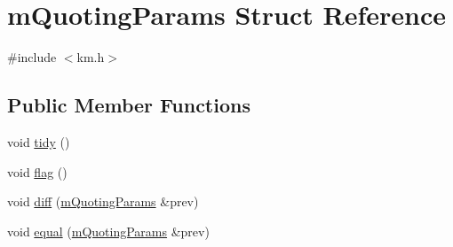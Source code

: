 \hypertarget{struct_k_1_1m_quoting_params}{}\section{m\+Quoting\+Params Struct Reference}
\label{struct_k_1_1m_quoting_params}


{\ttfamily \#include $<$km.\+h$>$}

\subsection*{Public Member Functions}
\begin{DoxyCompactItemize}
\item 
void \hyperlink{struct_k_1_1m_quoting_params_a5b3c419df4060973d19148fe5f75b275}{tidy} ()
\item 
void \hyperlink{struct_k_1_1m_quoting_params_a9897581e5bf85e3b75d7159f0621740f}{flag} ()
\item 
void \hyperlink{struct_k_1_1m_quoting_params_a342922b70b5ffb7b8b92b9b9ec1d9ee5}{diff} (\hyperlink{struct_k_1_1m_quoting_params}{m\+Quoting\+Params} \&prev)
\item 
void \hyperlink{struct_k_1_1m_quoting_params_a049d4509d364db17f6654111e95ad64b}{equal} (\hyperlink{struct_k_1_1m_quoting_params}{m\+Quoting\+Params} \&prev)
\end{DoxyCompactItemize}
